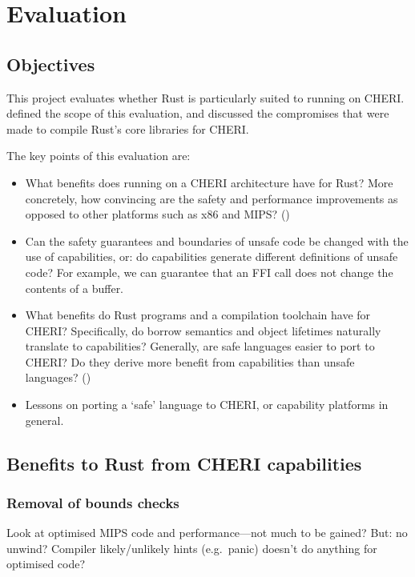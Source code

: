 \documentclass[dissertation.tex]{subfiles}
\begin{document}
\chapter{Evaluation}
\label{ch:eval}

\section{Objectives}
This project evaluates whether Rust is particularly suited to running on
CHERI.
 defined the scope of this evaluation, and
discussed the compromises that were made to compile Rust's core
libraries for CHERI.

The key points of this evaluation are:

\begin{itemize}
    \item What benefits does running on a CHERI architecture have for Rust?
    More concretely, how convincing are the safety and performance
    improvements as opposed to other platforms such as x86 and MIPS?
    ()
    \item Can the safety guarantees and boundaries of unsafe code be
    changed with the use of capabilities, or: do capabilities generate
    different definitions of unsafe code?
    For example, we can guarantee that an FFI call does not change the
    contents of a buffer.
    \item What benefits do Rust programs and a compilation toolchain
    have for CHERI?
    Specifically, do borrow semantics and object lifetimes naturally
    translate to capabilities?
    Generally, are safe languages easier to port to CHERI? Do they
    derive more benefit from capabilities than unsafe languages?
    ()
    \item Lessons on porting a `safe' language to CHERI, or capability
    platforms in general. 
\end{itemize}


\section{Benefits to Rust from CHERI capabilities}
\label{sec:eval-rust}

\subsection{Removal of bounds checks}
Look at optimised MIPS code and performance---not much to be gained?
But: no unwind? 
Compiler likely/unlikely hints (e.g.~panic) doesn't do anything for optimised code?
\end{document}
